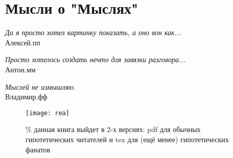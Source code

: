 \pagecolor{white}
\section*{Мысли о "Мыслях"}

\begin{flushright}
\emph{Да я просто хотел картинку показать, а оно вон как...}\\
    Алексей.пп %
\end{flushright}


\begin{flushright}
\emph{Просто хотелось создать нечто для завязки разговора...}\\
Антон.мм %
\end{flushright}


\begin{flushright}
\emph{Мыслей не измышляю.}\\
Владимир.фф %
\end{flushright}

\begin{figure}[ht!]
    \centering
    \texttt{[image: rea]}
    \caption{\% данная книга выйдет в 2-х версиях: pdf для обычных гипотетических читателей и tex для (ещё менее) гипотетических фанатов}
\end{figure}
